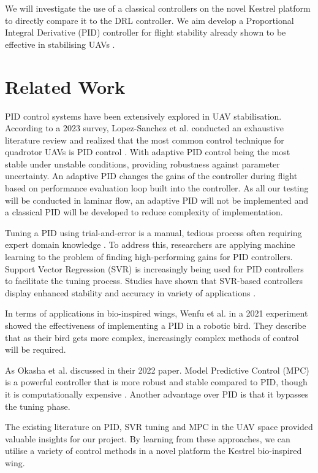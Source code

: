    We will investigate the use of a classical controllers on the novel
    Kestrel platform to directly compare it to the DRL controller.
    We aim develop a Proportional Integral Derivative (PID) controller
    for flight stability already shown to be effective in stabilising UAVs
    \cite{7}.

\section{Related Work}
    PID control systems have been extensively explored in UAV
    stabilisation. According to a 2023 survey, Lopez-Sanchez et al.
    conducted an exhaustive literature review and realized that the most
    common control technique for quadrotor UAVs is PID control \cite{7}. With
    adaptive PID control being the most stable under unstable conditions,
    providing robustness against parameter uncertainty. An adaptive PID
    changes the gains of the controller during flight based on performance
    evaluation loop built into the controller. As all our testing will be
    conducted in laminar flow, an adaptive PID will not be implemented and a
    classical PID will be developed to reduce complexity of implementation.

    Tuning a PID using trial-and-error is a manual, tedious process often
    requiring expert domain knowledge \cite{6}. To address this, researchers are
    applying machine learning to the problem of finding high-performing gains
    for PID controllers. Support Vector Regression (SVR) is increasingly being
    used for PID controllers to facilitate the tuning process. Studies have
    shown that SVR-based controllers display enhanced stability and accuracy
    in variety of applications \cite{8}.

    In terms of applications in bio-inspired wings, Wenfu et al.\cite{9} in a 2021
    experiment showed the effectiveness of implementing a PID in a robotic
    bird. They describe that as their bird gets more complex, increasingly
    complex methods of control will be required. 

    As Okasha et al. discussed in their 2022 paper. Model Predictive Control
    (MPC) is a powerful controller that is more robust and stable compared
    to PID, though it is computationally expensive \cite{10}. Another advantage
    over PID is that it bypasses the tuning phase.

    The existing literature on PID, SVR tuning and MPC in the UAV space
    provided valuable insights for our project. By learning from these
    approaches, we can utilise a variety of control methods in a novel
    platform the Kestrel bio-inspired wing.

